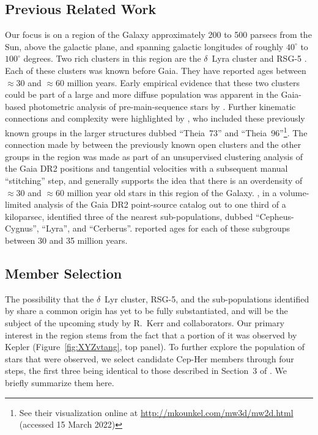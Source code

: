 \documentclass[12pt,twocolumn,linenumbers]{aastex63}
\begin{document}
\subsection{Previous Related Work}

Our focus is on a region of the Galaxy approximately 200 to 500
parsecs from the Sun, above the galactic plane, and spanning galactic
longitudes of roughly $40^\circ$ to $100^\circ$ degrees.  Two rich
clusters in this region are the $\delta$~Lyra cluster
\citep{stephenson_possible_1959} and RSG-5 \citep{roser_nine_2016}.
Each of these clusters was known before Gaia.  They have reported ages
between $\approx$30 and $\approx$60 million years.  Early empirical
evidence that these two clusters could be part of a large and more
diffuse population was apparent in the Gaia-based photometric analysis
of pre-main-sequence stars by \citet[][see their Figures~11
and~13]{Zari2018}.  Further kinematic connections and complexity were
highlighted by \citet{KounkelCovey2019}, who included these previously
known groups in the larger structures dubbed ``Theia~73'' and
``Theia~96''\footnote{See their visualization online at
\url{http://mkounkel.com/mw3d/mw2d.html} (accessed 15 March 2022)}.
The connection made by \citet{KounkelCovey2019} between the previously
known open clusters and the other groups in the region was made as
part of an unsupervised clustering analysis of the Gaia DR2 positions
and tangential velocities with a subsequent manual ``stitching'' step,
and generally supports the idea that there is an overdensity of
$\approx$30 and $\approx$60 million year old stars in this region of
the Galaxy.  \citet{Kerr2021}, in a volume-limited analysis of the
Gaia DR2 point-source catalog out to one third of a kiloparsec,
identified three of the nearest sub-populations, dubbed
``Cepheus-Cygnus'', ``Lyra'', and ``Cerberus''.  \citet{Kerr2021}
reported ages for each of these subgroups between 30 and 35 million
years.


\subsection{Member Selection}
\label{subsec:members}


The possibility that the $\delta$~Lyr cluster, RSG-5, and the
sub-populations identified by \citet{Kerr2021} share a common origin
has yet to be fully substantiated, and will be the subject of the upcoming
study by R.~Kerr and collaborators.  Our primary interest in the
region stems from the fact that a portion of it was observed by Kepler
(Figure~\ref{fig:XYZvtang}, top panel).  To further explore the
population of stars that were observed, we select candidate Cep-Her
members through four steps, the first three being identical to those
described in Section~3 of \citet{Kerr2021}.  We briefly summarize them
here.
\end{document}
